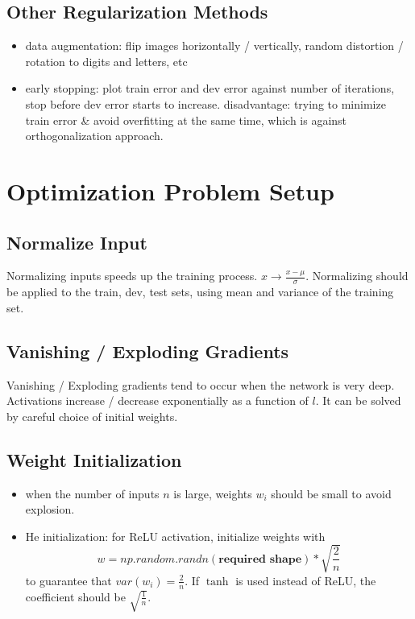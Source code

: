 \subsection{Other Regularization Methods}
\begin{itemize}
  \item data augmentation: flip images horizontally / vertically, random distortion / rotation to digits and letters, etc
  \item early stopping: plot train error and dev error against number of iterations, stop before dev error starts to increase. disadvantage: trying to minimize train error \& avoid overfitting at the same time, which is against orthogonalization approach.
\end{itemize}
\section{Optimization Problem Setup}
\subsection{Normalize Input}
Normalizing inputs speeds up the training process. $x\rightarrow \frac{x - \mu}{\sigma}$. Normalizing should be applied to the train, dev, test sets, using mean and variance of the training set.
\subsection{Vanishing / Exploding Gradients}
Vanishing / Exploding gradients tend to occur when the network is very deep. Activations increase / decrease exponentially as a function of $l$. It can be solved by careful choice of initial weights.
\subsection{Weight Initialization}
\begin{itemize}
\item when the number of inputs $n$ is large, weights $w_i$ should be small to avoid explosion. 
\item He initialization: for ReLU activation, initialize weights with 
\[w=np.random.randn(\textbf{required shape})*\sqrt{\frac{2}{n}}\]
to guarantee that $var(w_i)=\frac{2}{n}$. If $\tanh$ is used instead of ReLU, the coefficient should be $\sqrt{\frac{1}{n}}$.
\end{itemize}
